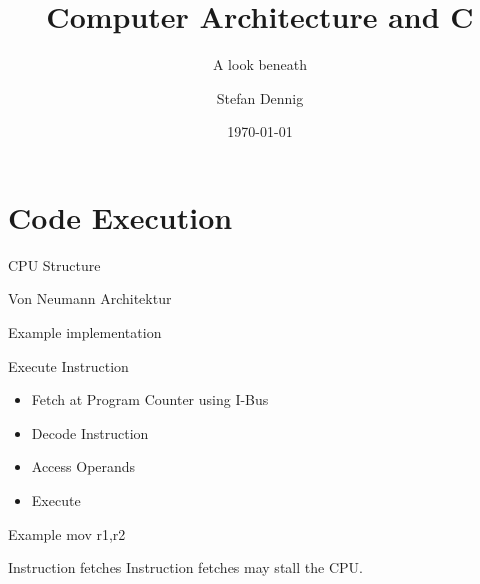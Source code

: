 \documentclass[10pt]{beamer}
\title{Computer Architecture and C}
\subtitle{A look beneath}
\date{\today}
\author{Stefan Dennig}
\institute{NewTec GmbH}
\begin{document}
\maketitle


\section[Intro]{Code Execution}

\begin{frame}[fragile]{CPU Structure}
  \begin{center}
  
  \end{center}
\end{frame}

\begin{frame}[fragile]{Von Neumann Architektur}
  \begin{center}
  
  \end{center}
\end{frame}

\begin{frame}[fragile]{Example implementation}
  \begin{center}
  
  \end{center}
\end{frame}

\begin{frame}[fragile]{Execute Instruction}
\begin{itemize}
  \item Fetch at Program Counter using I-Bus
  \item Decode Instruction
  \item Access Operands
  \item Execute
\end{itemize}

\begin{block}{Example}
  mov r1,r2
\end{block}

\begin{alertblock}{Instruction fetches}
 Instruction fetches may stall the CPU.
\end{alertblock}
\end{frame}
\end{document}
